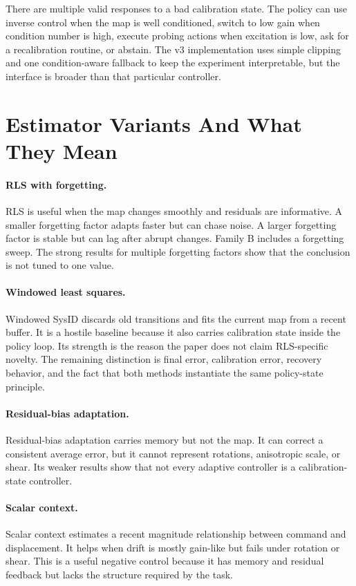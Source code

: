 \documentclass{article}
\begin{document}
There are multiple valid responses to a bad calibration state. The policy can
use inverse control when the map is well conditioned, switch to low gain when
condition number is high, execute probing actions when excitation is low, ask
for a recalibration routine, or abstain. The v3 implementation uses simple
clipping and one condition-aware fallback to keep the experiment interpretable,
but the interface is broader than that particular controller.

\section{Estimator Variants And What They Mean}

\paragraph{RLS with forgetting.}
RLS is useful when the map changes smoothly and residuals are informative. A
smaller forgetting factor adapts faster but can chase noise. A larger forgetting
factor is stable but can lag after abrupt changes. Family B includes a
forgetting sweep. The strong results for multiple forgetting factors show that
the conclusion is not tuned to one value.

\paragraph{Windowed least squares.}
Windowed SysID discards old transitions and fits the current map from a recent
buffer. It is a hostile baseline because it also carries calibration state
inside the policy loop. Its strength is the reason the paper does not claim
RLS-specific novelty. The remaining distinction is final error, calibration
error, recovery behavior, and the fact that both methods instantiate the same
policy-state principle.

\paragraph{Residual-bias adaptation.}
Residual-bias adaptation carries memory but not the map. It can correct a
consistent average error, but it cannot represent rotations, anisotropic scale,
or shear. Its weaker results show that not every adaptive controller is a
calibration-state controller.

\paragraph{Scalar context.}
Scalar context estimates a recent magnitude relationship between command and
displacement. It helps when drift is mostly gain-like but fails under rotation
or shear. This is a useful negative control because it has memory and residual
feedback but lacks the structure required by the task.
\end{document}
